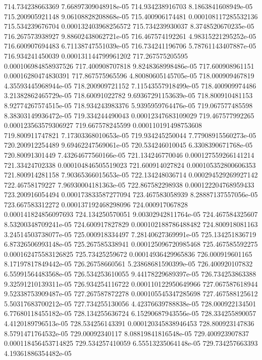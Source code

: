 {714.734238663369 7.66897309048918e-05
714.934238916703 8.1863841608949e-05
715.200905921148 9.06108828208868e-05
715.400906174481 0.000108117285532136
715.534239676704 0.000132403968256572
715.734239930037 8.3748520670235e-05
716.267573938927 9.88602438062721e-05
716.467574192261 4.98315221295252e-05
716.600907694483 6.71138747551039e-05
716.734241196706 5.78761143407887e-05
716.934241450039 0.000131144799961202
717.267575205595 0.000106984858937526
717.400908707818 9.8248368998486e-05
717.600908961151 0.00016280474830391
717.867575965596 4.80080605145705e-05
718.000909467819 4.35593445968944e-05
718.200909721152 7.11543557918499e-05
718.400909974486 3.21382862465729e-05
718.60091022782 9.69367291153639e-05
718.800910481153 8.92774267574515e-05
718.934243983376 5.9395959764476e-05
719.067577485598 8.38303149936472e-05
719.334244490043 0.00012347683109029
719.467577992265 0.000123563579306927
719.667578245599 0.000110191498753608
719.800911747821 7.17303368010653e-05
719.934245250044 7.77908915560273e-05
720.200912254489 9.69462247569061e-05
720.534246010045 6.3308390671768e-05
720.80091301449 7.43264677560166e-05
721.134246770046 0.000127559266141214
721.33424702338 0.000104846505519023
721.600914027824 0.000105352800606353
721.800914281158 7.90365366015653e-05
722.134248036714 0.000294529269927142
722.46758179227 7.96930004181363e-05
722.867582298938 0.000122204768959433
723.200916054494 0.000173833587277094
723.467583058939 8.28887137557056e-05
723.667583312272 0.000137192468298096
724.000917067828 0.000141824856097693
724.134250570051 9.00302942811764e-05
724.467584325607 8.53200348709241e-05
724.600917827829 0.000102188786488482
724.800918081163 3.24514503738077e-05
725.000918334497 7.28140627369991e-05
725.134251836719 6.87326506993148e-05
725.267585338941 0.000125096720985468
725.467585592275 0.000162475583126825
725.73425259672 0.00014936429965836
726.000919601165 8.17197817849442e-05
726.26758660561 5.23868681590399e-05
726.400920107832 6.55991564483568e-05
726.534253610055 9.44178229689397e-05
726.734253863388 9.32591210139311e-05
726.934254116722 0.000110122950649966
727.067587618944 9.52338753909487e-05
727.267587872278 0.000105545347285698
727.467588125612 5.50317683700212e-05
727.734255130056 4.42376639788838e-05
728.000922134501 6.77680118455182e-05
728.134255636724 6.15290687943556e-05
728.334255890057 4.4120189796513e-05
728.534256143391 0.000120345838946453
728.800923147836 8.5791471764532e-05
729.00092340117 8.08819841816548e-05
729.400923907837 0.000118456453714825
729.534257410059 6.55513235064148e-05
729.734257663393 4.19361886354482e-05
}
